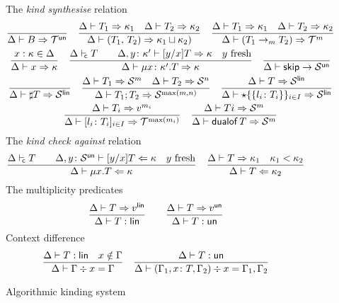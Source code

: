 \begin{figure}[h!]
  The \emph{kind synthesise} relation \hfill{}
  \begin{gather*}
    \frac{}{\algkindout{B}{\kindt^\un}}
    \quad 
    \frac{
      \algkindout{T_1}{\kind_1}
      \quad
      \algkindout{T_2}{\kind_2}
    }{
      \algkindout{\pairt{T_1}{T_2}}{\kind_1\join \kind_2)}
    }
    \quad
    \frac{
      \algkindout{T_1}{\kind_1}
      \quad
      \algkindout{T_2}{\kind_2}
    }{
      \algkindout{(\funt{T_1}{T_2})}{\kindt^m}
    }
    \\
    \frac{x : \kind \in \Delta}{\algkindout x \kind}
   \quad
  \frac{
    \isContr T
    \qquad
    \algkindout[\Delta, y\colon \kind'] {\subs yxT} \kind
    \quad
    y\text{ fresh}
  }{
    \algkindout{\rect {x\colon \kind'} T}{\kind}
  }
  \quad
  \frac{}{\Delta \Alg \skipt \rightarrow \kinds^\un}
  \\
  \frac{}{\algkindout{\msgt T}{\kinds^\lin}}
  \quad
  \frac{
    \algkindout{T_1}{\kinds^m}
    \quad
    \algkindout{T_2}{\kinds^n}
  }{
    \algkindout{\semit{T_1}{T_2}}{\kinds^{\max(m,n)}}
  }
  \quad
  \frac{
    \algkindout{T}{\kinds^\lin}
  }{
    \algkindout{\choicet{\{l_i\colon T_i\}}_{i\in I}}{\kinds^\lin}
  }
  \\
  \frac{
    \algkindout{T_i}{v^{m_i}}
  }{
    \algkindout{\datat{l_i\colon T_i}_{i\in I}}{\kindt^{\max(m_i)}}
  }  
  \quad
  \frac{
    \algkindout{Ti}{\kinds^m}
  }{
    \algkindout{\dualoft T}{\kinds^m}
  }
  \end{gather*}
  The \emph{kind check against} relation\hfill{}
  \begin{equation*}
    \frac{
      \isContr T
      \qquad
      \algkindin[\Delta, y\colon \kinds^\un] {\subs yxT} \kind
      \quad
      y\text{ fresh}
    }{
      \algkindin{\rect xT}{\kind}
    }
    \quad
    \frac{
      \algkindout{T}{\kind_1}
      \quad
      \isSubkind{\kind_1}{\kind_2}
    }{
      \algkindin T {\kind_2}
    }
  \end{equation*}
  The multiplicity predicates \hfill{}\quad{}
  \begin{equation*}
    \frac{
      \algkindout T {v^\lin}
    }{
      \isLin T
    }
    \qquad
    \frac{
      \algkindout T {v^\un}
    }{
      \isUn T
    }
  \end{equation*}
  Context difference \hfill{}
  \begin{equation*}
    \frac{
      \isLin T
      \quad
      x\notin\Gamma
    }{
      \ctxdiff \Gamma x \Gamma
    }
    \quad
    \frac{
      \isUn T
    }{
      \ctxdiff {(\Gamma_1,x\colon T,\Gamma_2)} x {\Gamma_1,\Gamma_2}
    }
  \end{equation*}
  \caption{Algorithmic kinding system}
  \label{fig:kinding-system}
\end{figure}


